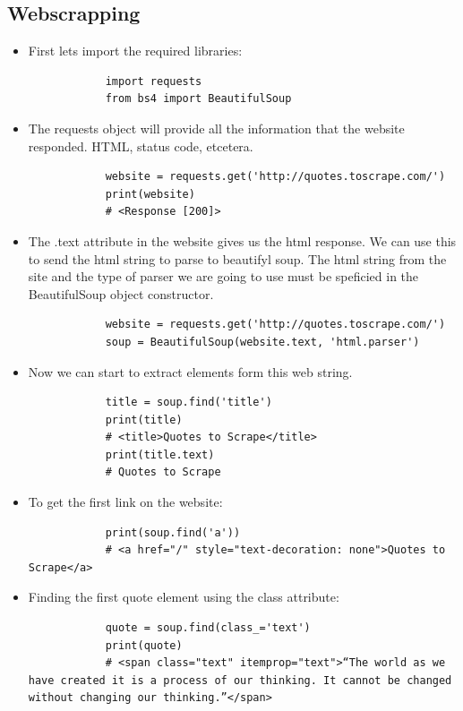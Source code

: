 \subsection{Webscrapping}
\begin{itemize}
    \item First lets import the required libraries:
        \begin{verbatim}
            import requests
            from bs4 import BeautifulSoup
        \end{verbatim}
    
    \item The requests object will provide all the information that the website responded. HTML, status code, etcetera.
        \begin{verbatim}
            website = requests.get('http://quotes.toscrape.com/')
            print(website)
            # <Response [200]>
        \end{verbatim}
    
    \item The .text attribute in the website gives us the html response. We can use this to send the html string to parse to beautifyl soup. The html string from the site and the type of parser we are going to use must be speficied in the BeautifulSoup object constructor.
        \begin{verbatim}
            website = requests.get('http://quotes.toscrape.com/')
            soup = BeautifulSoup(website.text, 'html.parser')
        \end{verbatim}
    
    \item Now we can start to extract elements form this web string.
        \begin{verbatim}
            title = soup.find('title')
            print(title)
            # <title>Quotes to Scrape</title>
            print(title.text)
            # Quotes to Scrape
        \end{verbatim}
    
    \item To get the first link on the website:
        \begin{verbatim}
            print(soup.find('a'))
            # <a href="/" style="text-decoration: none">Quotes to Scrape</a>
        \end{verbatim}
    
    \item Finding the first quote element using the class attribute:
        \begin{verbatim}
            quote = soup.find(class_='text')
            print(quote)
            # <span class="text" itemprop="text">“The world as we have created it is a process of our thinking. It cannot be changed without changing our thinking.”</span>
        \end{verbatim}
    

\end{itemize}
